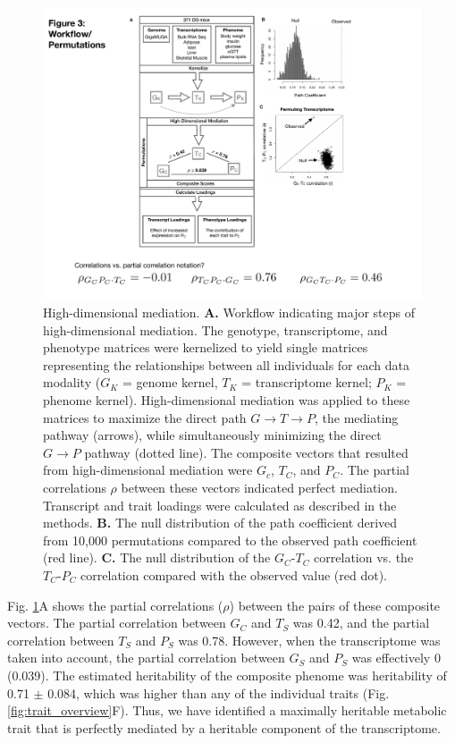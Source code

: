 \documentclass[
]{article}
\begin{document}
\begin{figure}[ht!]
\includegraphics[width=5in]{Figures/Fig3_workflow.pdf} 
\caption{High-dimensional mediation. \textbf{A.} Workflow indicating 
major steps of high-dimensional mediation. The genotype, transcriptome, 
and phenotype matrices were kernelized to yield single matrices representing 
the relationships between all individuals for each data modality ($G_K$ = 
genome kernel, $T_K$ = transcriptome kernel; $P_K$ = phenome kernel). High-dimensional 
mediation was applied to these matrices to maximize the direct path 
$G \rightarrow T \rightarrow P$, the mediating pathway (arrows), while 
simultaneously minimizing the direct $G \rightarrow P$ pathway (dotted line). 
The composite vectors that resulted from high-dimensional mediation were 
$G_c$, $T_C$, and $P_C$. The partial correlations $\rho$ between these vectors 
indicated perfect mediation. Transcript and trait loadings were calculated 
as described in the methods. \textbf{B.} The null distribution of the path 
coefficient derived from 10,000 permutations compared to the observed path 
coefficient (red line). \textbf{C.} The null distribution of the $G_C$-$T_C$ 
correlation vs. the $T_C$-$P_C$ correlation compared with the observed value 
(red dot).
}
\label{fig:workflow}
\end{figure}

Fig. \ref{fig:workflow}A shows the partial correlations (\(\rho\))
between the pairs of these composite vectors. The partial correlation
between \(G_C\) and \(T_S\) was 0.42, and the partial correlation
between \(T_S\) and \(P_S\) was 0.78. However, when the transcriptome
was taken into account, the partial correlation between \(G_S\) and
\(P_S\) was effectively 0 (0.039). The estimated heritability of the
composite phenome was heritability of 0.71 \(\pm\) 0.084, which was
higher than any of the individual traits (Fig.
\ref{fig:trait_overview}F). Thus, we have identified a maximally
heritable metabolic trait that is perfectly mediated by a heritable
component of the transcriptome.
\end{document}
